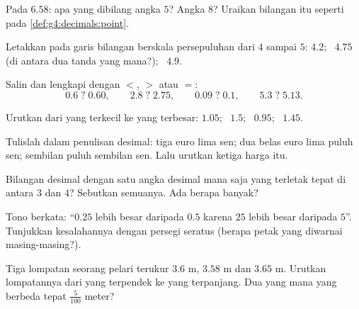 \begin{exercise}[$\star$]\label{exo:g4:decimals:4}
Pada $6.58$: apa yang dibilang angka $5$? Angka $8$? Uraikan
bilangan itu seperti pada \cref{def:g4:decimals:point}.
\end{exercise}

\begin{exercise}[$\star$]\label{exo:g4:decimals:5}
Letakkan pada garis bilangan berskala persepuluhan dari $4$ sampai
$5$: $4.2$; \ $4.75$ (di antara dua tanda yang mana?); \ $4.9$.
\end{exercise}

\begin{exercise}[$\star$]\label{exo:g4:decimals:6}
Salin dan lengkapi dengan $<$, $>$ atau $=$:
\[
0.6 \;?\; 0.60, \qquad
2.8 \;?\; 2.75, \qquad
0.09 \;?\; 0.1, \qquad
5.3 \;?\; 5.13 .
\]
\end{exercise}

\begin{exercise}[$\star$]\label{exo:g4:decimals:7}
Urutkan dari yang terkecil ke yang terbesar: $1.05$; \ $1.5$; \ $0.95$; \ $1.45$.
\end{exercise}

\begin{exercise}[$\star$]\label{exo:g4:decimals:8}
Tulislah dalam penulisan desimal: tiga euro lima sen; dua belas euro
lima puluh sen; sembilan puluh sembilan sen. Lalu urutkan ketiga harga itu.
\end{exercise}

\begin{exercise}[$\star$]\label{exo:g4:decimals:9}
Bilangan desimal dengan satu angka desimal mana saja yang terletak
tepat di antara $3$ dan $4$? Sebutkan semuanya. Ada berapa banyak?
\end{exercise}

\begin{exercise}[$\star\star$]\label{exo:g4:decimals:10}
Tono berkata: ``$0.25$ lebih besar daripada $0.5$ karena $25$ lebih
besar daripada $5$''. Tunjukkan kesalahannya dengan persegi seratus
(berapa petak yang diwarnai masing-masing?).
\end{exercise}

\begin{exercise}[$\star\star$]\label{exo:g4:decimals:11}
Tiga lompatan seorang pelari terukur $3.6$ m, $3.58$ m dan $3.65$ m.
Urutkan lompatannya dari yang terpendek ke yang terpanjang. Dua yang
mana yang berbeda tepat $\frac{5}{100}$ meter?

\end{exercise}
